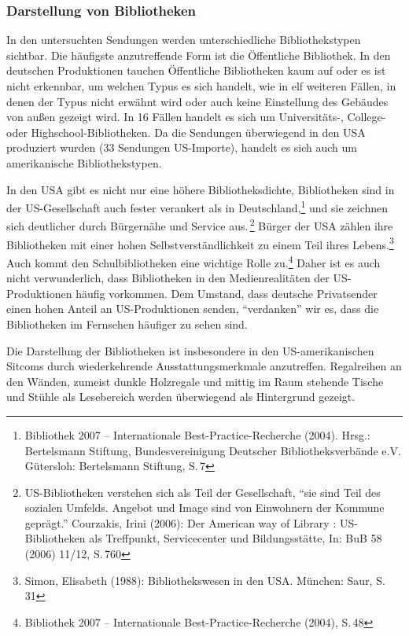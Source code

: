 \subsubsection{Darstellung von
Bibliotheken}\label{darstellung-von-bibliotheken}

In den untersuchten Sendungen werden unterschiedliche Bibliothekstypen
sichtbar. Die häufigste anzutreffende Form ist die Öffentliche
Bibliothek. In den deutschen Produktionen tauchen Öffentliche
Bibliotheken kaum auf oder es ist nicht erkennbar, um welchen Typus es
sich handelt, wie in elf weiteren Fällen, in denen der Typus nicht
erwähnt wird oder auch keine Einstellung des Gebäudes von außen gezeigt
wird. In 16 Fällen handelt es sich um Universitäts-, College- oder
Highschool-Bibliotheken. Da die Sendungen überwiegend in den USA
produziert wurden (33 Sendungen US-Importe), handelt es sich auch um
amerikanische Bibliothekstypen.

In den USA gibt es nicht nur eine höhere Bibliotheksdichte, Bibliotheken
sind in der US-Gesellschaft auch fester verankert als in
Deutschland,\footnote{Bibliothek 2007 -- Internationale
  Best-Practice-Recherche (2004). Hrsg.: Bertelsmann Stiftung,
  Bundesvereinigung Deutscher Bibliotheksverbände e.V. Gütersloh:
  Bertelsmann Stiftung, S.\,7} und sie zeichnen sich deutlicher durch
Bürgernähe und Service aus.\,\footnote{US-Bibliotheken verstehen sich als
  Teil der Gesellschaft, \enquote{sie sind Teil des sozialen Umfelds.
  Angebot und Image sind von Einwohnern der Kommune geprägt.} Courzakis,
  Irini (2006): Der American way of Library : US-Bibliotheken als
  Treffpunkt, Servicecenter und Bildungsstätte, In: BuB 58 (2006) 11/12,
  S.\,760} Bürger der USA zählen ihre Bibliotheken mit einer hohen
Selbstverständlichkeit zu einem Teil ihres Lebens.\footnote{Simon,
  Elisabeth (1988): Bibliothekswesen in den USA. München: Saur, S.\,31}
Auch kommt den Schulbibliotheken eine wichtige Rolle zu.\footnote{Bibliothek
  2007 -- Internationale Best-Practice-Recherche (2004), S.\,48} Daher
ist es auch nicht verwunderlich, dass Bibliotheken in den
Medienrealitäten der US-Produktionen häufig vorkommen. Dem Umstand, dass
deutsche Privatsender einen hohen Anteil an US-Produktionen senden,
\enquote{verdanken} wir es, dass die Bibliotheken im Fernsehen häufiger
zu sehen sind.

Die Darstellung der Bibliotheken ist insbesondere in den
US-amerikanischen Sitcoms durch wiederkehrende Ausstattungsmerkmale
anzutreffen. Regalreihen an den Wänden, zumeist dunkle Holzregale und
mittig im Raum stehende Tische und Stühle als Lesebereich werden
überwiegend als Hintergrund gezeigt.

